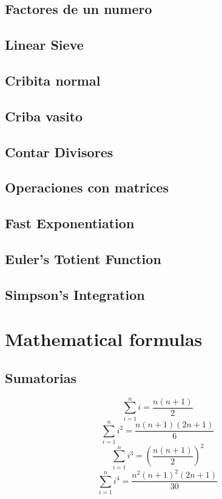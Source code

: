 \documentclass[10pt,landscape,twocolumn,a4paper,notitlepage]{article}
\begin{document}
\subsection{Factores de un numero}
\subsection{Linear Sieve}
\subsection{Cribita normal}
\subsection{Criba vasito}
\subsection{Contar Divisores}
\subsection{Operaciones con matrices}
\subsection{Fast Exponentiation}
\subsection{Euler's Totient Function}
\subsection{Simpson's Integration}
\section{Mathematical formulas}
\subsection{Sumatorias}
\begin{equation}
    \sum_{i=1}^n i = \frac{n(n+1)}{2}
\end{equation}
\begin{equation}
    \sum_{i=1}^n i^2 = \frac{n(n+1)(2n+1)}{6}
\end{equation}
\begin{equation}
    \sum_{i=1}^n i^3 = \left(\frac{n(n+1)}{2}\right)^2
\end{equation}
\begin{equation}
    \sum_{i=1}^n i^4 = \frac{n^2(n+1)^2(2n+1)}{30}
\end{equation}
\end{document}
